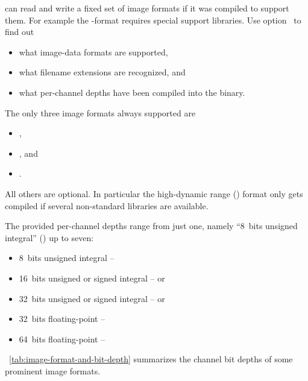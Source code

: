\App{} can read and write a fixed set of image formats if it was compiled to support them.  For
example the -format requires special support libraries.  Use
option~ to find out

\begin{itemize}
\item
  what image-data formats are supported,

\item
  what filename extensions are recognized, and

\item
  what per-channel depths have been compiled into the \appcmd{} binary.
\end{itemize}

\noindent The only three image formats always supported are

\begin{itemize}
\item
  ,

\item
  , and

\item
  .
\end{itemize}

\noindent All others are optional.  In particular the high-dynamic range () format
 only gets compiled if several
non-standard libraries are available.

The provided per-channel depths range from just one, namely ``8~bits
unsigned integral'' () up to seven:
  \begin{itemize}
  \item 8~bits unsigned integral -- 
  \item 16~bits unsigned or signed integral --  or 
  \item 32~bits unsigned or signed integral --  or 
  \item 32~bits floating-point -- 
  \item 64~bits floating-point -- 
  \end{itemize}

  \tableName~\ref{tab:image-format-and-bit-depth} summarizes the channel bit depths of some
  prominent image formats.

